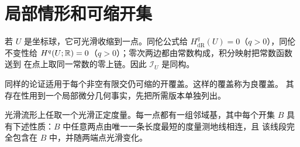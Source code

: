 \section{局部情形和可缩开集}

若 $U$ 是坐标球，它可光滑收缩到一点。同伦公式给
$H_{\mathrm{dR}}^q(U)=0$（$q>0$），同伦不变性给
$H^q(U;\mathbb{R})=0$（$q>0$）；零次两边都由常数构成，积分映射把常数函数送到
在点上取同一常数的零上链。因此 $\mathcal I_U$ 是同构。

同样的论证适用于每个非空有限交仍可缩的开覆盖。这样的覆盖称为良覆盖。
其存在性用到一个局部微分几何事实，先把所需版本单独列出。

\begin{lemma}[局部强凸邻域]\label{lem:local-strongly-convex-neighborhoods}
光滑流形上任取一个光滑正定度量。每一点都有一组邻域基，其中每个开集
$B$ 具有下述性质：$B$ 中任意两点由唯一一条长度最短的度量测地线相连，且
该线段完全包含在 $B$ 中，并随两端点光滑变化。
\end{lemma}
